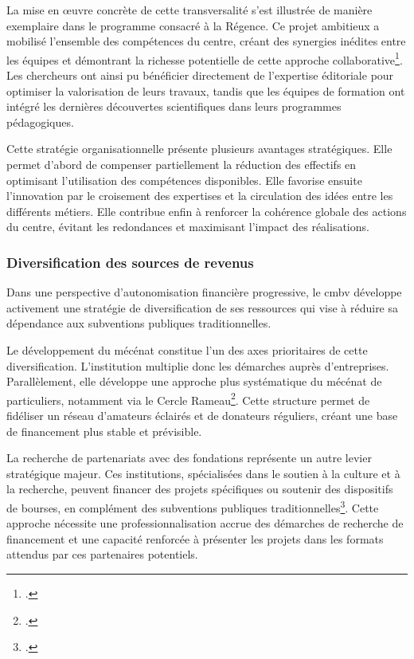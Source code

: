 La mise en œuvre concrète de cette transversalité s'est illustrée de manière exemplaire dans le programme consacré à la Régence. Ce projet ambitieux a mobilisé l'ensemble des compétences du centre, créant des synergies inédites entre les équipes et démontrant la richesse potentielle de cette approche collaborative\footcite{centredemusiquebaroquedeversaillesRapportActivite2023}. Les chercheurs ont ainsi pu bénéficier directement de l'expertise éditoriale pour optimiser la valorisation de leurs travaux, tandis que les équipes de formation ont intégré les dernières découvertes scientifiques dans leurs programmes pédagogiques.

Cette stratégie organisationnelle présente plusieurs avantages stratégiques. Elle permet d'abord de compenser partiellement la réduction des effectifs en optimisant l'utilisation des compétences disponibles. Elle favorise ensuite l'innovation par le croisement des expertises et la circulation des idées entre les différents métiers. Elle contribue enfin à renforcer la cohérence globale des actions du centre, évitant les redondances et maximisant l'impact des réalisations.

\subsubsection{Diversification des sources de revenus}

Dans une perspective d'autonomisation financière progressive, le \gls{cmbv} développe activement une stratégie de diversification de ses ressources qui vise à réduire sa dépendance aux subventions publiques traditionnelles.

Le développement du mécénat constitue l'un des axes prioritaires de cette diversification. L'institution multiplie donc les démarches auprès d'entreprises. Parallèlement, elle développe une approche plus systématique du mécénat de particuliers, notamment via le Cercle Rameau\footcite{centredemusiquebaroquedeversaillesProjetEtablissement2022}. Cette structure permet de fidéliser un réseau d'amateurs éclairés et de donateurs réguliers, créant une base de financement plus stable et prévisible.

La recherche de partenariats avec des fondations représente un autre levier stratégique majeur. Ces institutions, spécialisées dans le soutien à la culture et à la recherche, peuvent financer des projets spécifiques ou soutenir des dispositifs de bourses, en complément des subventions publiques traditionnelles\footcite{centredemusiquebaroquedeversaillesProjetEtablissement2022}. Cette approche nécessite une professionnalisation accrue des démarches de recherche de financement et une capacité renforcée à présenter les projets dans les formats attendus par ces partenaires potentiels.

